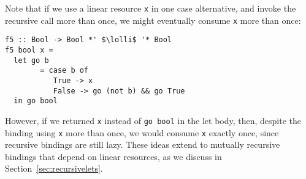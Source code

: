 \documentclass[acmsmall,review,anonymous]{acmart}
\newcommand{\incode}[1]{\lstinline{#1}}
\newcommand{\lolli}{\multimap}
\begin{document}


Note that if we use a linear resource \incode{x} in one case alternative, and invoke
the recursive call more than once, we might eventually consume \incode{x} more than
once:
%
\begin{noway}
\begin{lstlisting}
f5 :: Bool -> Bool *' $\lolli$ '* Bool
f5 bool x =
  let go b
        = case b of
           True -> x
           False -> go (not b) && go True
  in go bool
\end{lstlisting}
\end{noway}
However, if we returned \incode{x} instead of \incode{go bool} in the let body, then, despite
the binding using \incode{x} more than once, we would consume \incode{x} exactly once,
since recursive bindings are still lazy.
%
These ideas extend to mutually recursive bindings that depend on
linear resources, as we discuss in Section~\ref{sec:recursivelets}.
\end{document}
